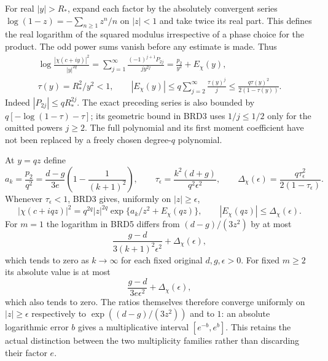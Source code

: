 For real $|y|>R_*$, expand each factor by the absolutely convergent
series $\log(1-z)=-\sum_{n\geq1}z^n/n$ on $|z|<1$ and take
twice its real part. This defines the real logarithm of the squared
modulus irrespective of a phase choice for the product. The odd
power sums vanish before any estimate is made. Thus
\[
\begin{gathered}
 \log\frac{|\chi(c+iy)|^2}{|y|^{2q}}
   =\sum_{j=1}^{\infty}\frac{(-1)^{j+1}P_{2j}}{j y^{2j}}
   =\frac{p_2}{y^2}+E_\chi(y),\\
 \tau(y)=R_*^2/y^2<1,\qquad
 |E_\chi(y)|\leq
 q\sum_{j=2}^{\infty}\frac{\tau(y)^j}{j}
 \leq\frac{q\tau(y)^2}{2(1-\tau(y))}.
\end{gathered}\tag{BRD3}
\]
Indeed $|P_{2j}|\leq qR_*^{2j}$. The exact preceding series is
also bounded by $q[-\log(1-\tau)-\tau]$; its geometric bound in
BRD3 uses $1/j\leq1/2$ only for the omitted powers $j\geq2$.
The full polynomial and its first moment coefficient have not been
replaced by a freely chosen degree-$q$ polynomial.

At $y=qz$ define
\[
 a_k=\frac{p_2}{q^2}
  =\frac{d-g}{3e}\left(1-\frac1{(k+1)^2}\right),\qquad
 \tau_\epsilon=\frac{k^2(d+g)}{q^2\epsilon^2},\qquad
 \Delta_\chi(\epsilon)=
       \frac{q\tau_\epsilon^2}{2(1-\tau_\epsilon)}.
\tag{BRD4}
\]
Whenever $\tau_\epsilon<1$, BRD3 gives, uniformly on
$|z|\geq\epsilon$,
\[
 |\chi(c+iqz)|^2=q^{2q}|z|^{2q}
      \exp\{a_k/z^2+E_\chi(qz)\},
 \qquad |E_\chi(qz)|\leq\Delta_\chi(\epsilon).
\tag{BRD5}
\]
For $m=1$ the logarithm in BRD5 differs from
$(d-g)/(3z^2)$ by at most
\[
 \frac{g-d}{3(k+1)^2\epsilon^2}+\Delta_\chi(\epsilon),
\tag{BRD6}
\]
which tends to zero as $k\to\infty$ for each fixed original
$d,g,\epsilon>0$. For fixed $m\geq2$ its absolute value is
at most
\[
 \frac{g-d}{3e\epsilon^2}+\Delta_\chi(\epsilon),
\tag{BRD7}
\]
which also tends to zero. The ratios themselves therefore converge
uniformly on $|z|\geq\epsilon$ respectively to
$\exp((d-g)/(3z^2))$ and to $1$: an absolute logarithmic error
$b$ gives a multiplicative interval $[e^{-b},e^b]$.
This retains the actual distinction between the two multiplicity
families rather than discarding their factor $e$.

